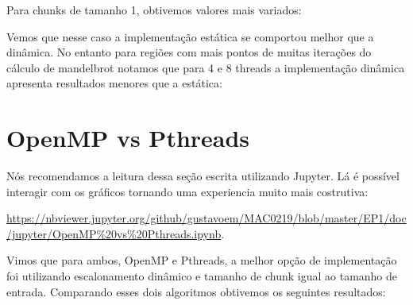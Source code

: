 \documentclass[12pt]{article}
\begin{document}
Para chunks de tamanho 1, obtivemos valores mais variados:
\begin{figure}[H]
\end{figure}

Vemos que nesse caso a implementação estática se comportou melhor que a dinâmica. No entanto para regiões com mais pontos de muitas iterações do cálculo de mandelbrot notamos que para 4 e 8 threads a implementação dinâmica apresenta resultados menores que a estática:

\begin{figure}[H]
\end{figure}
\begin{figure}[H]
\end{figure}
\begin{figure}[H]
\end{figure}

\newpage
\section{OpenMP vs Pthreads}
Nós recomendamos a leitura dessa seção escrita utilizando Jupyter. Lá é possível interagir com os gráficos tornando uma experiencia muito mais costrutiva:

\href{https://nbviewer.jupyter.org/github/gustavoem/MAC0219/blob/master/EP1/doc/jupyter/OpenMP%20vs%20Pthreads.ipynb}{https://nbviewer.jupyter.org/github/gustavoem/MAC0219/blob/master/EP1/doc/jupyter/OpenMP\%20vs\%20Pthreads.ipynb}. 

Vimos que para ambos, OpenMP e Pthreads, a melhor opção de implementação foi utilizando escalonamento dinâmico e tamanho de chunk igual ao tamanho de entrada. Comparando esses dois algoritmos obtivemos os seguintes resultados:

\begin{figure}[H]
\end{figure}
\begin{figure}[H]
\end{figure}
\begin{figure}[H]
\end{figure}
\begin{figure}[H]
\end{figure}
\end{document}
